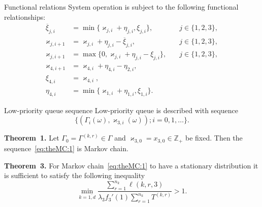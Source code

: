 \documentclass[10pt]{beamer}
\begin{document}
\begin{frame}{Functional relations}
System operation is subject to the following functional relationships:
\begin{align}
\overline{\xi}_{j,i}&=\min\{\varkappa_{j,i}+\eta_{j,i},\xi_{j,i}\}, \quad & j\in \{1,2,3\},\\
\varkappa_{j,i+1}&=\varkappa_{j,i}+\eta_{j,i}-\overline{\xi}_{j,i}, \quad & j\in \{1,2,3\},\\
\varkappa_{j,i+1}&=\max\{{0,\varkappa_{j,i}+\eta_{j,i}-\xi_{j,i}}\}, \quad & j\in \{1,2,3\},\\
\varkappa_{4,i+1}&=\varkappa_{4,i}+\eta_{4,i}-\eta_{2,i}, \quad &\\
\xi_{4,i} & = \varkappa_{4,i}, & \\
\eta_{4,i} & = \min\{ \varkappa_{1,i} + \eta_{1,i}, \xi_{1,i}\}.
\end{align}
\end{frame}





\begin{frame}{Low-priority queue sequence}
Low-priority queue is described with sequence
\begin{equation}
\label{eq:theMC:1}
\{(\Gamma_i(\omega), \varkappa_{3,i}(\omega)); i =0, 1, \ldots\}.
\end{equation}
\vfill
\begin{block}{\bf Theorem~1.}
Let $\Gamma_0=\Gamma^{(k,r)}\in \Gamma$ and $\varkappa_{3,0}=x_{3,0}\in \mathbb{Z}_+$ be fixed. Then the sequence~\eqref{eq:theMC:1} is Markov chain.
\end{block}

\begin{block}{\bf Theorem~3.}
For Markov chain~\eqref{eq:theMC:1} to have a stationary distribution it is sufficient to satisfy the following inequality
\begin{equation*}
\min_{k=\overline{1,d}} { \frac{\sum_{r = 1}^{n_k} \ell(k,r,3) }{\lambda_3 f_3'(1) \sum_{r=1}^{n_k} T^{(k,r)} }}>1.
\label{sufficient:double}
\end{equation*}
\end{block}

\end{frame}
\end{document}

